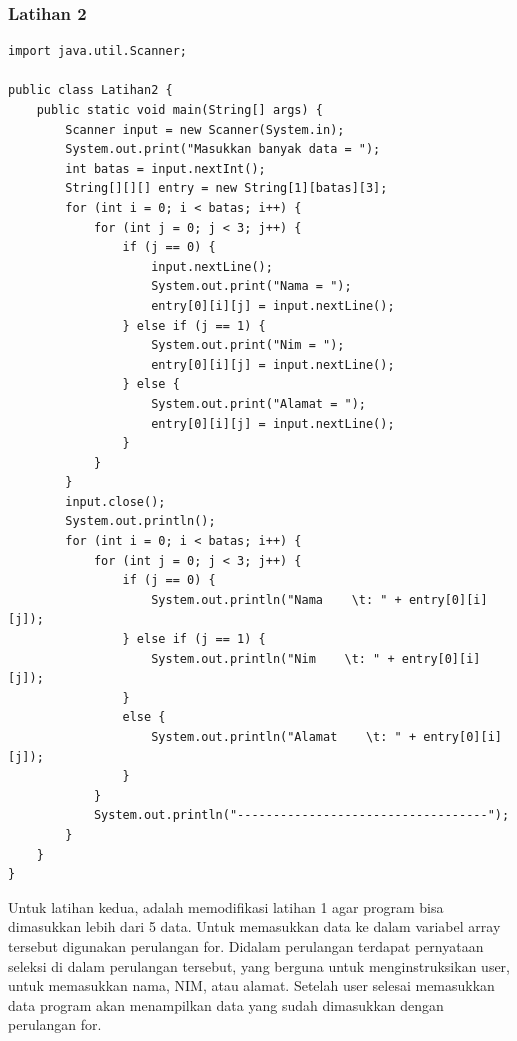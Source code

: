 \documentclass[a4paper,12pt]{article}
\begin{document}
\subsubsection{Latihan 2}
\begin{lstlisting}
import java.util.Scanner;

public class Latihan2 {
    public static void main(String[] args) {
        Scanner input = new Scanner(System.in);
        System.out.print("Masukkan banyak data = ");
        int batas = input.nextInt();
        String[][][] entry = new String[1][batas][3];
        for (int i = 0; i < batas; i++) {
            for (int j = 0; j < 3; j++) {
                if (j == 0) {
                    input.nextLine();
                    System.out.print("Nama = ");
                    entry[0][i][j] = input.nextLine();
                } else if (j == 1) {
                    System.out.print("Nim = ");
                    entry[0][i][j] = input.nextLine();
                } else {
                    System.out.print("Alamat = ");
                    entry[0][i][j] = input.nextLine();
                }
            }
        }
        input.close();
        System.out.println();
        for (int i = 0; i < batas; i++) {
            for (int j = 0; j < 3; j++) {
                if (j == 0) {
                    System.out.println("Nama    \t: " + entry[0][i][j]);
                } else if (j == 1) {
                    System.out.println("Nim    \t: " + entry[0][i][j]);
                }
                else {
                    System.out.println("Alamat    \t: " + entry[0][i][j]);
                }
            }
            System.out.println("-----------------------------------");
        }
    }
}
\end{lstlisting}
Untuk latihan kedua, adalah memodifikasi latihan 1 agar program bisa dimasukkan lebih dari 5 data. Untuk memasukkan data ke dalam variabel array tersebut
digunakan perulangan for. Didalam perulangan terdapat pernyataan seleksi di dalam perulangan tersebut, yang berguna untuk menginstruksikan user, untuk
memasukkan nama, NIM, atau alamat. Setelah user selesai memasukkan data program akan menampilkan data yang sudah dimasukkan dengan perulangan for.
\end{document}

